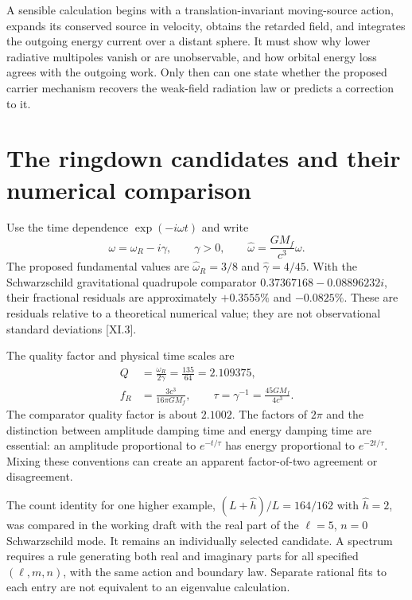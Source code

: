 A sensible calculation begins with a translation-invariant moving-source action, expands its conserved source in velocity, obtains the retarded field, and integrates the outgoing energy current over a distant sphere. It must show why lower radiative multipoles vanish or are unobservable, and how orbital energy loss agrees with the outgoing work. Only then can one state whether the proposed carrier mechanism recovers the weak-field radiation law or predicts a correction to it.

\section{The ringdown candidates and their numerical comparison}
Use the time dependence $\exp(-i\omega t)$ and write
\begin{equation}
 \omega=\omega_R-i\gamma,\qquad \gamma>0,\qquad
 \widehat\omega=\frac{GM_f}{c^3}\omega.
 \label{c11:frequencyconvention}
\end{equation}
The proposed fundamental values are $\widehat\omega_R=3/8$ and $\widehat\gamma=4/45$. With the Schwarzschild gravitational quadrupole comparator $0.37367168-0.08896232i$, their fractional residuals are approximately $+0.3555\%$ and $-0.0825\%$. These are residuals relative to a theoretical numerical value; they are not observational standard deviations [XI.3].

The quality factor and physical time scales are
\begin{align}
 Q&=\frac{\omega_R}{2\gamma}=\frac{135}{64}=2.109375,
 \label{c11:q}\\
 f_R&=\frac{3c^3}{16\pi GM_f},\qquad
 \tau=\gamma^{-1}=\frac{45GM_f}{4c^3}.
 \label{c11:physicalscales}
\end{align}
The comparator quality factor is about $2.1002$. The factors of $2\pi$ and the distinction between amplitude damping time and energy damping time are essential: an amplitude proportional to $e^{-t/\tau}$ has energy proportional to $e^{-2t/\tau}$. Mixing these conventions can create an apparent factor-of-two agreement or disagreement.

The count identity for one higher example, $(L+\widehat h)/L=164/162$ with $\widehat h=2$, was compared in the working draft with the real part of the $\ell=5$, $n=0$ Schwarzschild mode. It remains an individually selected candidate. A spectrum requires a rule generating both real and imaginary parts for all specified $(\ell,m,n)$, with the same action and boundary law. Separate rational fits to each entry are not equivalent to an eigenvalue calculation.


